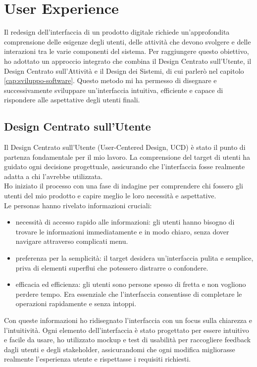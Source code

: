 \chapter{User Experience}
\label{cap:user-experience}

Il redesign dell'interfaccia di un prodotto digitale richiede un'approfondita comprensione delle esigenze degli utenti, delle attività che devono svolgere e delle interazioni tra le varie componenti del sistema. Per raggiungere questo obiettivo, ho adottato un approccio integrato che combina il Design Centrato sull'Utente, il Design Centrato sull'Attività e il Design dei Sistemi, di cui parlerò nel capitolo \ref{cap:sviluppo-software}. Questo metodo mi ha permesso di disegnare e successivamente sviluppare un'interfaccia intuitiva, efficiente e capace di rispondere alle aspettative degli utenti finali.

\section{Design Centrato sull'Utente}

Il Design Centrato sull'Utente (User-Centered Design, UCD) è stato il punto di partenza fondamentale per il mio lavoro. La comprensione del target di utenti ha guidato ogni decisione progettuale, assicurando che l'interfaccia fosse realmente adatta a chi l'avrebbe utilizzata.\\
Ho iniziato il processo con una fase di indagine per comprendere chi fossero gli utenti del mio prodotto e capire meglio le loro necessità e aspettative.\\

Le personas hanno rivelato informazioni cruciali:
\begin{itemize}
    \item necessità di accesso rapido alle informazioni: gli utenti hanno bisogno di trovare le informazioni immediatamente e in modo chiaro, senza dover navigare attraverso complicati menu.
    \item preferenza per la semplicità: il target desidera un'interfaccia pulita e semplice, priva di elementi superflui che potessero distrarre o confondere.
    \item efficacia ed efficienza: gli utenti sono persone spesso di fretta e non vogliono perdere tempo. Era essenziale che l'interfaccia consentisse di completare le operazioni rapidamente e senza intoppi.
\end{itemize}

\noindent Con queste informazioni ho ridisegnato l'interfaccia con un focus sulla chiarezza e l'intuitività. Ogni elemento dell'interfaccia è stato progettato per essere intuitivo e facile da usare, ho utilizzato mockup e test di usabilità per raccogliere feedback dagli utenti e degli stakeholder, assicurandomi che ogni modifica migliorasse realmente l'esperienza utente e rispettasse i requisiti richiesti.

